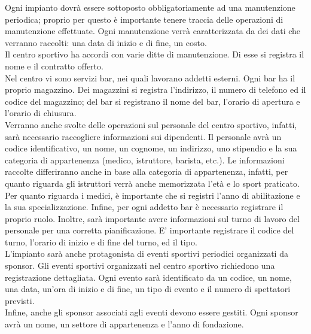 \documentclass{article}
\begin{document}
\begin{flushleft}
        \vspace{2mm}
        Ogni impianto dovrà essere sottoposto obbligatoriamente ad una manutenzione periodica; proprio per questo è importante tenere traccia delle operazioni di manutenzione effettuate. 
        Ogni manutenzione verrà caratterizzata da dei dati che verranno raccolti: una data di inizio e di fine, un costo. \\
        \vspace{2mm}
        Il centro sportivo ha accordi con varie ditte di manutenzione. Di esse si registra il nome e il contratto offerto. \\
        \vspace{2mm}
        Nel centro vi sono servizi bar, nei quali lavorano addetti esterni. Ogni bar ha il proprio magazzino. Dei magazzini si registra l'indirizzo, il numero di telefono ed il codice del magazzino; del bar si registrano il nome del bar, l'orario di apertura e l'orario di chiusura. \\
        \vspace{2mm}
        Verranno anche svolte delle operazioni sul personale del centro sportivo, infatti, sarà necessario raccogliere informazioni sui dipendenti. Il personale avrà un codice identificativo, un nome, un cognome, un indirizzo, uno stipendio e la sua categoria di appartenenza (medico, istruttore, barista, etc.). Le informazioni raccolte differiranno anche in base alla categoria di appartenenza, infatti, per quanto riguarda gli istruttori verrà anche memorizzata l'età e lo sport praticato. Per quanto riguarda i medici, è importante che si registri l'anno di abilitazione e la sua specializzazione. Infine, per ogni addetto bar è necessario registrare il proprio ruolo. Inoltre, sarà importante avere informazioni sul turno di lavoro del personale per una corretta pianificazione. E' importante registrare il codice del turno, l'orario di inizio e di fine del turno, ed il tipo. \\
        \vspace{2mm}
        L'impianto sarà anche protagonista di eventi sportivi periodici organizzati da sponsor. Gli eventi sportivi organizzati nel centro sportivo richiedono una registrazione dettagliata. Ogni evento sarà identificato da un codice, un nome, una data, un'ora di inizio e di fine, un tipo di evento e il numero di spettatori previsti. \\
        \vspace{2mm}
        Infine, anche gli sponsor associati agli eventi devono essere gestiti. Ogni sponsor avrà un nome, un settore di appartenenza e l'anno di fondazione. \\
    \end{flushleft}
\end{document}
